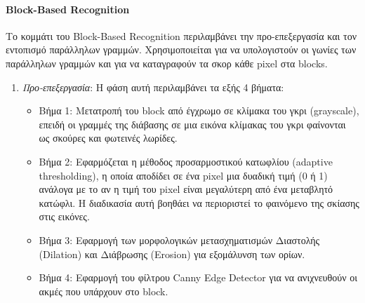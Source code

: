 \paragraph{Block-Based Recognition}\label{block-based}
Το κομμάτι του Block-Based Recognition περιλαμβάνει την προ-επεξεργασία και τον εντοπισμό παράλληλων γραμμών. Χρησιμοποιείται για να υπολογιστούν οι γωνίες των παράλληλων γραμμών και για να καταγραφούν τα σκορ κάθε pixel στα blocks.
\begin{enumerate}[1)]
    \item \emph{Προ-επεξεργασία}: Η φάση αυτή περιλαμβάνει τα εξής 4 βήματα:
    \begin{itemize}
        \item Βήμα 1: Μετατροπή του block από έγχρωμο σε κλίμακα του γκρι (grayscale), επειδή οι γραμμές της διάβασης σε μια εικόνα κλίμακας του γκρι φαίνονται ως σκούρες και φωτεινές λωρίδες.
        \item Βήμα 2: Εφαρμόζεται η μέθοδος προσαρμοστικού κατωφλίου (adaptive thresholding), η οποία αποδίδει σε ένα pixel μια δυαδική τιμή (0 ή 1) ανάλογα με το αν η τιμή του pixel είναι μεγαλύτερη από ένα μεταβλητό κατώφλι. Η διαδικασία αυτή βοηθάει να περιοριστεί το φαινόμενο της σκίασης στις εικόνες.
        \item Βήμα 3: Εφαρμογή των μορφολογικών μετασχηματισμών Διαστολής (Dilation) και Διάβρωσης (Erosion) για εξομάλυνση των ορίων.
        \item Βήμα 4: Εφαρμογή του φίλτρου Canny Edge Detector για να ανιχνευθούν οι ακμές που υπάρχουν στο block.
    \end{itemize}
    

\end{enumerate}
